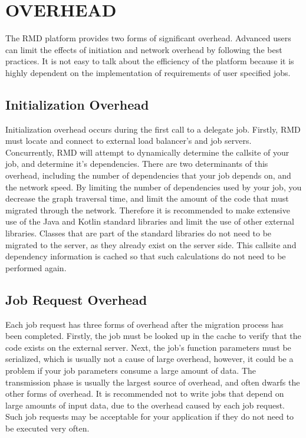 \section{OVERHEAD}\label{sec:overhead}

The RMD platform provides two forms of significant overhead.
Advanced users can limit the effects of initiation and network
overhead by following the best practices.
It is not easy to talk about the efficiency of the platform
because it is highly dependent on the implementation of requirements
of user specified jobs.

\subsection{Initialization Overhead}\label{subsec:initializationOverhead}

Initialization overhead occurs during the first call to a delegate job.
Firstly, RMD must locate and connect to external load balancer's and
job servers.
Concurrently, RMD will attempt to dynamically determine the callsite
of your job, and determine it's dependencies.
There are two determinants of this overhead, including the
number of dependencies that your job depends on, and the network
speed.
By limiting the number of dependencies used by your job,
you decrease the graph traversal time, and limit the amount
of the code that must migrated through the network.
Therefore it is recommended to make extensive use of the Java and Kotlin
standard libraries and limit the use of other external libraries.
Classes that are part of the standard libraries do not need to be migrated
to the server, as they already exist on the server side.
This callsite and dependency information is cached so that such calculations
do not need to be performed again.


\subsection{Job Request Overhead}\label{subsec:networkOverhead}

Each job request has three forms of overhead after the migration
process has been completed.
Firstly, the job must be looked up in the cache to verify
that the code exists on the external server.
Next, the job's function parameters must be serialized, which
is usually not a cause of large overhead, however, it could be a problem
if your job parameters consume a large amount of data.
The transmission phase is usually the largest source of overhead,
and often dwarfs the other forms of overhead.
It is recommended not to write jobs that depend on large amounts
of input data, due to the overhead caused by each job request.
Such job requests may be acceptable for your application if they do
not need to be executed very often.
